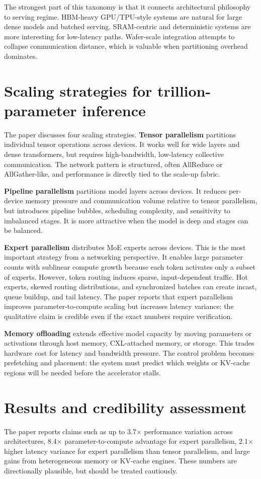 \documentclass[10pt]{article}
\begin{document}
The strongest part of this taxonomy is that it connects architectural philosophy to serving regime. HBM-heavy GPU/TPU-style systems are natural for large dense models and batched serving. SRAM-centric and deterministic systems are more interesting for low-latency paths. Wafer-scale integration attempts to collapse communication distance, which is valuable when partitioning overhead dominates.

\section{Scaling strategies for trillion-parameter inference}
The paper discusses four scaling strategies. \textbf{Tensor parallelism} partitions individual tensor operations across devices. It works well for wide layers and dense transformers, but requires high-bandwidth, low-latency collective communication. The network pattern is structured, often AllReduce or AllGather-like, and performance is directly tied to the scale-up fabric.

\textbf{Pipeline parallelism} partitions model layers across devices. It reduces per-device memory pressure and communication volume relative to tensor parallelism, but introduces pipeline bubbles, scheduling complexity, and sensitivity to imbalanced stages. It is more attractive when the model is deep and stages can be balanced.

\textbf{Expert parallelism} distributes MoE experts across devices. This is the most important strategy from a networking perspective. It enables large parameter counts with sublinear compute growth because each token activates only a subset of experts. However, token routing induces sparse, input-dependent traffic. Hot experts, skewed routing distributions, and synchronized batches can create incast, queue buildup, and tail latency. The paper reports that expert parallelism improves parameter-to-compute scaling but increases latency variance; the qualitative claim is credible even if the exact numbers require verification.

\textbf{Memory offloading} extends effective model capacity by moving parameters or activations through host memory, CXL-attached memory, or storage. This trades hardware cost for latency and bandwidth pressure. The control problem becomes prefetching and placement: the system must predict which weights or KV-cache regions will be needed before the accelerator stalls.

\section{Results and credibility assessment}
The paper reports claims such as up to 3.7$\times$ performance variation across architectures, 8.4$\times$ parameter-to-compute advantage for expert parallelism, 2.1$\times$ higher latency variance for expert parallelism than tensor parallelism, and large gains from heterogeneous memory or KV-cache engines. These numbers are directionally plausible, but should be treated cautiously.
\end{document}
